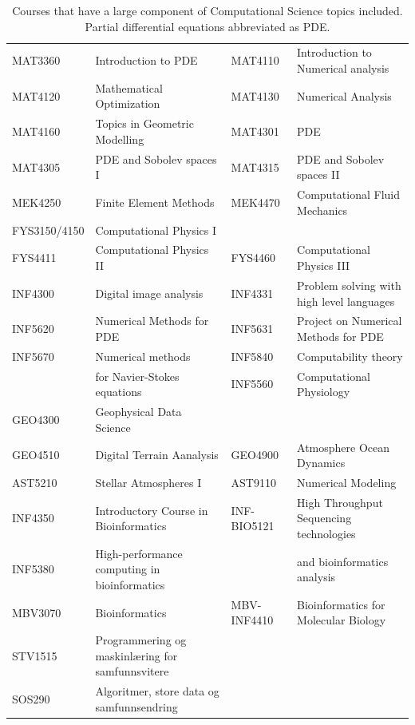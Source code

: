 \documentclass[a4paper,10pt]{article}
\begin{document}
\begin{table}[t]
    \centering
\caption{Courses that have a large component of Computational Science topics included. Partial differential equations abbreviated as PDE.}
\label{tab:CScourses}
    \tiny
    \begin{tabular}{llll}
    \hline
MAT3360& Introduction to PDE&
MAT4110& Introduction to Numerical analysis\\
MAT4120& Mathematical Optimization&
MAT4130& Numerical Analysis\\
MAT4160& Topics in Geometric Modelling&
MAT4301& PDE\\
MAT4305& PDE and Sobolev spaces I&
MAT4315& PDE and Sobolev spaces II\\
MEK4250& Finite Element Methods &
MEK4470& Computational Fluid Mechanics\\
FYS3150/4150& Computational Physics I\\
FYS4411& Computational Physics II&
FYS4460& Computational Physics III\\
INF4300& Digital image analysis&
INF4331& Problem solving with high level languages\\
INF5620& Numerical Methods for PDE&
INF5631& Project on Numerical Methods for PDE\\
INF5670& Numerical methods&
INF5840& Computability theory\\
& for Navier-Stokes equations&INF5560& Computational Physiology\\
GEO4300& Geophysical Data Science\\
GEO4510& Digital Terrain Aanalysis&
GEO4900& Atmosphere Ocean Dynamics\\
AST5210& Stellar Atmospheres I&
AST9110& Numerical Modeling\\
INF4350& Introductory Course in Bioinformatics&
INF-BIO5121& High Throughput Sequencing technologies\\
INF5380& High-performance computing in bioinformatics&
& and bioinformatics analysis\\
MBV3070& Bioinformatics&
MBV-INF4410& Bioinformatics for Molecular Biology\\
STV1515& Programmering og maskinlæring for samfunnsvitere\\
SOS290& Algoritmer, store data og samfunnsendring\\

 \hline
\end{tabular}

\end{table}
\end{document}
